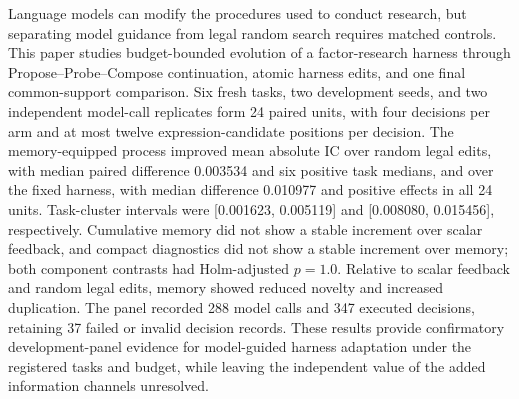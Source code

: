 Language models can modify the procedures used to conduct research, but separating model guidance from legal random search requires matched controls. This paper studies budget-bounded evolution of a factor-research harness through Propose--Probe--Compose continuation, atomic harness edits, and one final common-support comparison. Six fresh tasks, two development seeds, and two independent model-call replicates form 24 paired units, with four decisions per arm and at most twelve expression-candidate positions per decision. The memory-equipped process improved mean absolute IC over random legal edits, with median paired difference 0.003534 and six positive task medians, and over the fixed harness, with median difference 0.010977 and positive effects in all 24 units. Task-cluster intervals were [0.001623, 0.005119] and [0.008080, 0.015456], respectively. Cumulative memory did not show a stable increment over scalar feedback, and compact diagnostics did not show a stable increment over memory; both component contrasts had Holm-adjusted $p=1.0$. Relative to scalar feedback and random legal edits, memory showed reduced novelty and increased duplication. The panel recorded 288 model calls and 347 executed decisions, retaining 37 failed or invalid decision records. These results provide confirmatory development-panel evidence for model-guided harness adaptation under the registered tasks and budget, while leaving the independent value of the added information channels unresolved.
